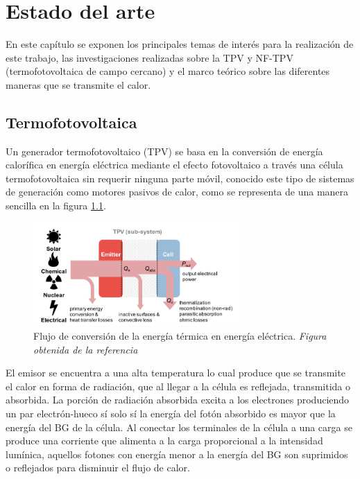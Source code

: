 \chapter{Estado del arte}
En este capítulo se exponen los principales temas de interés para la realización de este trabajo, las investigaciones realizadas sobre la TPV y NF-TPV (termofotovoltaica de campo cercano) y el marco teórico sobre las diferentes maneras que se transmite el calor.

\section{Termofotovoltaica}
Un generador termofotovoltaico (TPV) se basa en la conversión de energía calorífica en energía eléctrica mediante el efecto fotovoltaico a través una célula termofotovoltaica sin requerir ninguna parte móvil, conocido este tipo de sistemas de generación como motores pasivos de calor, como se representa de una manera sencilla en la figura \ref{fig:TPV_Subsistema}.
\begin{figure}[H]
	\centering
	\includegraphics[width=0.7\textwidth]{figuras/TPV_Subsistema.png}
	\caption[Flujo de conversión de la energía térmica en energía eléctrica]{Flujo de conversión de la energía térmica en energía eléctrica. \textit{Figura obtenida de la referencia \cite{Present_Efficiencies_and_Future_Opportunities_in_Thermophotovoltaics}} }
	\label{fig:TPV_Subsistema}
	
\end{figure}
El emisor se encuentra a una alta temperatura lo cual produce que se transmite el calor en forma de radiación, que al llegar a la célula es reflejada, transmitida o absorbida. La porción de radiación absorbida excita a los electrones produciendo un par electrón-hueco sí solo sí la energía del fotón absorbido es mayor que la energía del BG de la célula. Al conectar los terminales de la célula a una carga se produce una corriente que alimenta a la carga proporcional a la intensidad lumínica, aquellos fotones con energía menor a la energía del BG son suprimidos o reflejados para disminuir el flujo de calor\cite{Present_Efficiencies_and_Future_Opportunities_in_Thermophotovoltaics}.\\\\

